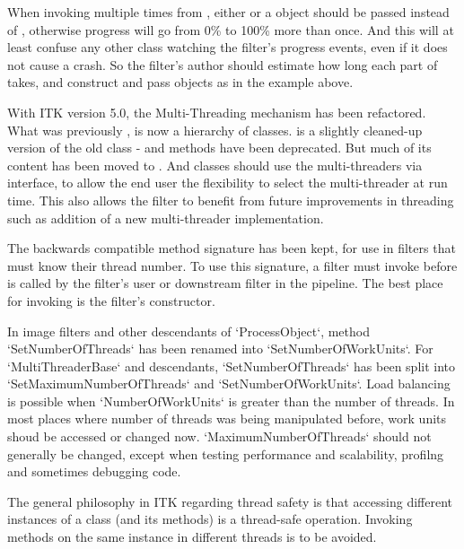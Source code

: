 When invoking  multiple times from
, either  or a
 object should be passed instead of ,
otherwise progress will go from 0\% to 100\% more than once. And this
will at least confuse any other class watching the filter's progress events,
even if it does not cause a crash. So the filter's author should estimate
how long each part of  takes, and construct and pass
 objects as in the example above.

With ITK version 5.0, the Multi-Threading mechanism has been refactored.
What was previously , is now a hierarchy of classes.
 is a slightly cleaned-up version of the old
class -  and  methods have been
deprecated. But much of its content has been moved to
. And classes should use the multi-threaders via
 interface, to allow the end user the flexibility to
select the multi-threader at run time. This also allows the filter to
benefit from future improvements in threading such as addition of a new
multi-threader implementation.

The backwards compatible  method
signature has been kept, for use in filters that must know their thread number.
To use this signature, a filter must invoke
 before  is called by
the filter's user or downstream filter in the pipeline. The best place for
invoking  is the filter's constructor.

In image filters and other descendants of `ProcessObject`, method
`SetNumberOfThreads` has been renamed into `SetNumberOfWorkUnits`.
For `MultiThreaderBase` and descendants, `SetNumberOfThreads` has been
split into `SetMaximumNumberOfThreads` and `SetNumberOfWorkUnits`.
Load balancing is possible when `NumberOfWorkUnits` is greater
than the number of threads. In most places where number of threads was
being manipulated before, work units shoud be accessed or changed now.
`MaximumNumberOfThreads` should not generally be changed, except when
testing performance and scalability, profilng and sometimes debugging code.

The general philosophy in ITK regarding thread safety is that accessing
different instances of a class (and its methods) is a thread-safe operation.
Invoking methods on the same instance in different threads is to be avoided.


